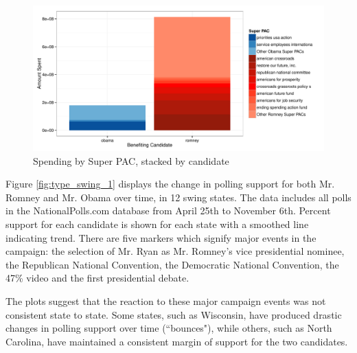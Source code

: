 \documentclass[11pt]{article}\usepackage{graphicx, color}
\newenvironment{knitrout}{}{} %
\begin{document}
\begin{knitrout}
\color{fgcolor}\begin{figure}[H]


{\centering \includegraphics[width=\textwidth]{figure/PAC_plot} 

}

\caption[Spending by Super PAC, stacked by candidate]{Spending by Super PAC, stacked by candidate\label{fig:PAC_plot}}
\end{figure}

\end{knitrout}





Figure \ref{fig:type_swing_1} displays the change in polling support for both Mr. Romney and Mr. Obama over time, in 12 swing states. The data includes all polls in the NationalPolls.com database from April 25th to November 6th. Percent support for each candidate is shown for each state with a smoothed line indicating trend. There are five markers which signify major events in the campaign: the selection of Mr. Ryan as Mr. Romney's vice presidential nominee, the Republican National Convention, the Democratic National Convention, the 47\% video and the first presidential debate. 

The plots suggest that the reaction to these major campaign events was not consistent state to state. Some states, such as Wisconsin, have produced drastic changes in polling support over time (``bounces"), while others, such as North Carolina, have maintained a consistent margin of support for the two candidates.
\end{document}
